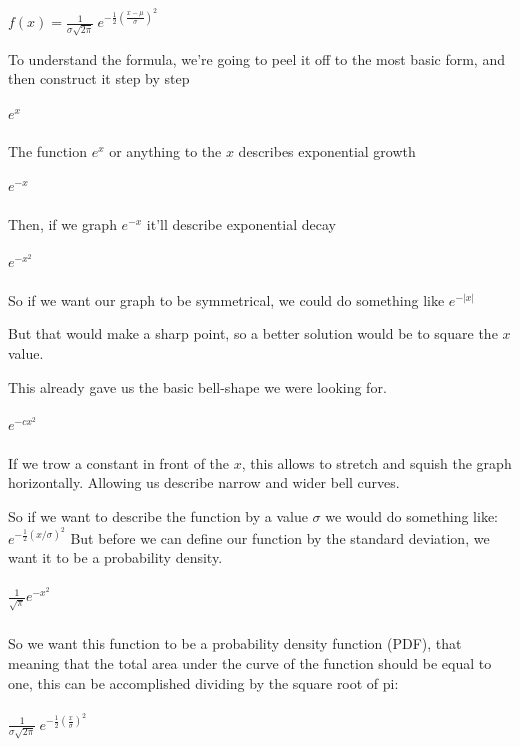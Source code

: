 \documentclass[11pt]{article}
\begin{document}
\(f(x) = \frac{1}{\sigma \sqrt{2\pi}} \ e^{-\frac{1}{2}(\frac{x - \mu }{\sigma})^2}\)

To understand the formula, we're going to peel it off to the most basic
form, and then construct it step by step

\hypertarget{ex}{%
\subparagraph{\texorpdfstring{\(e^x\)}{e\^{}x}}\label{ex}}

The function \(e^x\) or anything to the \(x\) describes exponential
growth


\hypertarget{e-x}{%
\subparagraph{\texorpdfstring{\(e^{-x}\)}{e\^{}\{-x\}}}\label{e-x}}

Then, if we graph \(e^{-x}\) it'll describe exponential decay


\hypertarget{e-x2}{%
\subparagraph{\texorpdfstring{\(e^{-x^2}\)}{e\^{}\{-x\^{}2\}}}\label{e-x2}}

So if we want our graph to be symmetrical, we could do something like
\(e^{-|x|}\)

But that would make a sharp point, so a better solution would be to
square the \(x\) value.

This already gave us the basic bell-shape we were looking for.

\hypertarget{e-cx2}{%
\subparagraph{\texorpdfstring{\(e^{-cx^2}\)}{e\^{}\{-cx\^{}2\}}}\label{e-cx2}}

If we trow a constant in front of the \(x\), this allows to stretch and
squish the graph horizontally. Allowing us describe narrow and wider
bell curves.

So if we want to describe the function by a value \(\sigma\) we would do
something like: \(e^{-\frac{1}{2}(x/\sigma)^2}\) But before we can
define our function by the standard deviation, we want it to be a
probability density.

\hypertarget{frac1sqrtpi-e-x2}{%
\subparagraph{\texorpdfstring{\(\frac{1}{\sqrt\pi} e^{-x^2}\)}{\textbackslash frac\{1\}\{\textbackslash sqrt\textbackslash pi\} e\^{}\{-x\^{}2\}}}\label{frac1sqrtpi-e-x2}}

So we want this function to be a probability density function (PDF),
that meaning that the total area under the curve of the function should
be equal to one, this can be accomplished dividing by the square root of
pi:

\hypertarget{frac1sigma-sqrt2pi-e-frac12-left-fracxsigma-right2}{%
\subparagraph{\texorpdfstring{\(\frac{1}{\sigma \sqrt{2\pi}} \ e^{-\frac{1}{2} \left (\frac{x}{\sigma} \right)^2}\)}{\textbackslash frac\{1\}\{\textbackslash sigma \textbackslash sqrt\{2\textbackslash pi\}\} \textbackslash{} e\^{}\{-\textbackslash frac\{1\}\{2\} \textbackslash left (\textbackslash frac\{x\}\{\textbackslash sigma\} \textbackslash right)\^{}2\}}}\label{frac1sigma-sqrt2pi-e-frac12-left-fracxsigma-right2}}
\end{document}
